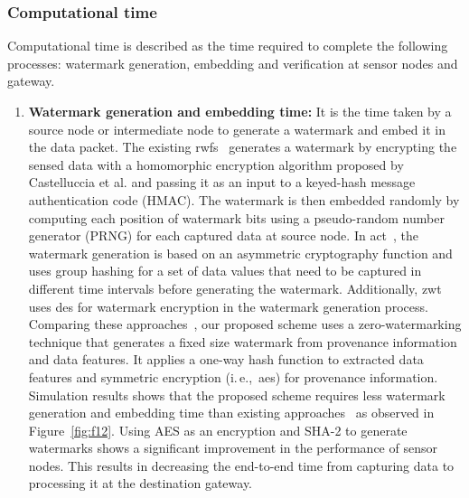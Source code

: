 \documentclass{llncs}
\newcommand{\ie}{i.\,e.,~}
\begin{document}
\subsubsection{Computational time}
Computational time is described as the time required to complete the following processes: watermark generation, embedding and verification at sensor nodes and gateway. 

\begin{enumerate}
\item \textbf{Watermark generation and embedding time:}  It is the time taken by a source node or intermediate node to generate a watermark and embed it in the data packet. The existing \gls*{rwfs}~\cite{Alromith2018} generates a watermark by encrypting the sensed data with a homomorphic encryption algorithm proposed by Castelluccia et al. \cite{Castelluccia2009} and passing it as an input to a keyed-hash message authentication code (HMAC). The watermark is then embedded randomly by computing each position of watermark bits using a pseudo-random number generator (PRNG) for each captured data at source node. In \gls*{act}~\cite{Sun2013}, the watermark generation is based on an asymmetric cryptography function and uses group hashing for a set of data values that need to be captured in different time intervals before generating the watermark. Additionally, \gls*{zwt}~\cite{hameed2018} uses \gls*{des} for watermark encryption in the watermark generation process. Comparing these approaches~\cite{Alromith2018,Sun2013,hameed2018}, our proposed scheme uses a zero-watermarking technique that generates a fixed size watermark from provenance information and data features. It applies a one-way hash function to extracted data features and symmetric encryption (\ie \gls*{aes}) for provenance information. Simulation results shows that the proposed scheme requires less watermark generation and embedding time than existing approaches~\cite{Alromith2018,Sun2013,hameed2018} as observed in Figure~\ref{fig:f12}. Using AES as an encryption and SHA-2 to generate watermarks shows a significant improvement in the performance of sensor nodes. This results in decreasing the end-to-end time from capturing data to processing it at the destination gateway. \\

\end{enumerate}
\end{document}
